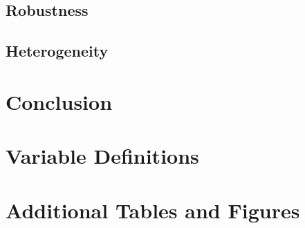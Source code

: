 \documentclass[12pt]{article}
\begin{document}
\subsection{Robustness}

\subsection{Heterogeneity}


\section{Conclusion}





\newpage
\appendix

\section{Variable Definitions}
\label{app:variables}

\section{Additional Tables and Figures}
\label{app:additional}
\end{document}
